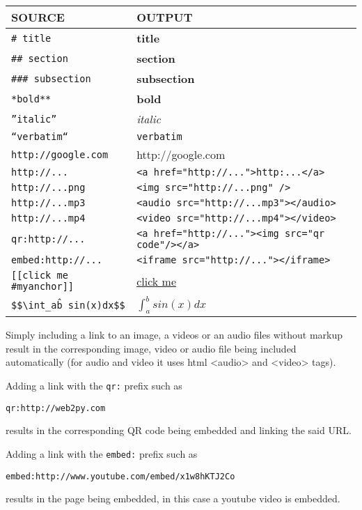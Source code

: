 \documentclass[justified,sixbynine,notoc]{tufte-book}
\def\ft{\small\tt}
\begin{document}
\begin{fullwidth}
\goodbreak\begin{center}
{\begin{tabular}{ll}\hline
{\bf SOURCE}                 & {\bf OUTPUT}\\ \hline
{\ft \# title}                & {\bf title}\\
{\ft \#\# section}             & {\bf section}\\
{\ft \#\#\# subsection}         & {\bf subsection}\\
{\ft **bold**}               & {\bf bold}\\
{\ft ''italic''}             & {\it italic}\\
{\ft ``verbatim``}       & {\ft verbatim}\\
{\ft http://google.com}      & http://google.com\\
{\ft http://...} & {\ft <a href="http://...">http:...</a>}\\
{\ft http://...png} & {\ft <img src="http://...png" />}\\
{\ft http://...mp3} & {\ft <audio src="http://...mp3"></audio>}\\
{\ft http://...mp4} & {\ft <video src="http://...mp4"></video>}\\
{\ft qr:http://...} & {\ft <a href="http://..."><img src="qr code"/></a>}\\
{\ft embed:http://...} & {\ft <iframe src="http://..."></iframe>}\\
{\ft [[click me \#myanchor]]} & {\footnotesize\href{\#myanchor}{click me}}\\
{\ft \$}{\ft \${\textbackslash}int\_a\^b sin(x)dx\$}{\ft \$}  & $\int_a^b sin(x)dx$ \\ \hline
\end{tabular}}
\end{center}
Simply including a link to an image, a videos or an audio files without markup result in the corresponding image, video or audio file being included automatically (for audio and video it uses html <audio> and <video> tags).

Adding a link with the {\ft qr:} prefix such as

\begin{lstlisting}
qr:http://web2py.com
\end{lstlisting}
\noindent results in the corresponding QR code being embedded and linking the said URL.

Adding a link with the {\ft embed:} prefix such as

\begin{lstlisting}
embed:http://www.youtube.com/embed/x1w8hKTJ2Co
\end{lstlisting}
\noindent results in the page being embedded, in this case a youtube video is embedded.


\end{fullwidth}
\end{document}
